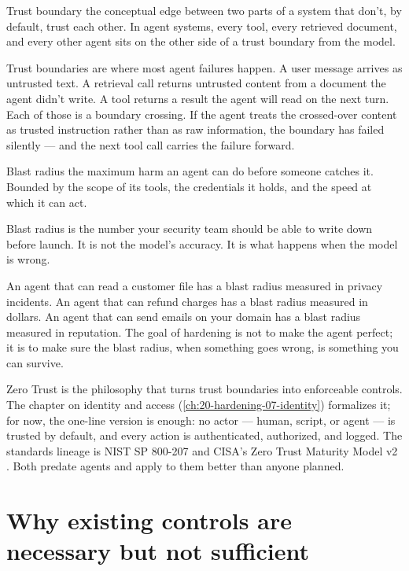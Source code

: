 \begin{TNdefinition}{Trust boundary}
the conceptual edge between two parts of a system that don't, by default, trust each other. In agent systems, every tool, every retrieved document, and every other agent sits on the other side of a trust boundary from the model.
\end{TNdefinition}

Trust boundaries are where most agent failures happen. A user message arrives as untrusted text. A retrieval call returns untrusted content from a document the agent didn't write. A tool returns a result the agent will read on the next turn. Each of those is a boundary crossing. If the agent treats the crossed-over content as trusted instruction rather than as raw information, the boundary has failed silently --- and the next tool call carries the failure forward.

\begin{TNdefinition}{Blast radius}
the maximum harm an agent can do before someone catches it. Bounded by the scope of its tools, the credentials it holds, and the speed at which it can act.
\end{TNdefinition}

Blast radius is the number your security team should be able to write down before launch. It is not the model's accuracy. It is what happens when the model is wrong.

An agent that can read a customer file has a blast radius measured in privacy incidents. An agent that can refund charges has a blast radius measured in dollars. An agent that can send emails on your domain has a blast radius measured in reputation. The goal of hardening is not to make the agent perfect; it is to make sure the blast radius, when something goes wrong, is something you can survive.

Zero Trust is the philosophy that turns trust boundaries into enforceable controls. The chapter on identity and access (\autoref{ch:20-hardening-07-identity}) formalizes it; for now, the one-line version is enough: no actor --- human, script, or agent --- is trusted by default, and every action is authenticated, authorized, and logged. The standards lineage is NIST SP 800-207 \citep{nist-sp800-207} and CISA's Zero Trust Maturity Model v2 \citep{cisa-ztmm-v2}. Both predate agents and apply to them better than anyone planned.

\section{Why existing controls are necessary but not sufficient}

